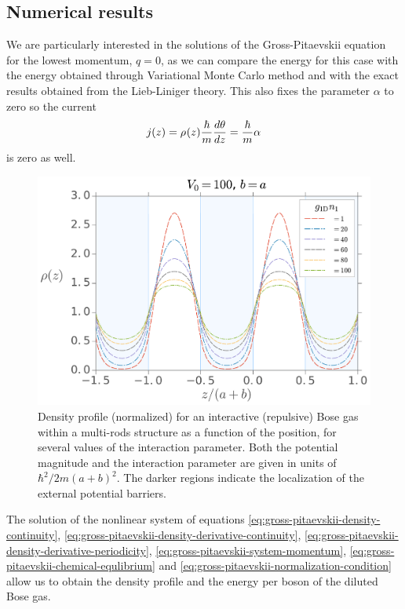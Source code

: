 \subsection{Numerical results}

We are particularly interested in the solutions of the Gross-Pitaevskii equation
for the lowest momentum, $q = 0$, as we can compare the energy for this case
with the energy obtained through Variational Monte Carlo method and with the
exact results obtained from the Lieb-Liniger theory. This also fixes the
parameter $\alpha$ to zero so the current
%
\begin{equation}
  j(z) = {\rho_{}}(z) \frac{\hbar}{m} \frac{d\theta}{dz} = \frac{\hbar}{m} \alpha
\end{equation}
%
is zero as well.
%
\begin{figure}[t!]
  \centering
  \includegraphics[width=0.75\linewidth]{./figures/density_profile_gp_u0-100_r-1}
  \caption{Density profile (normalized) for an interactive (repulsive) Bose gas
    within a multi-rods structure as a function of the position, for several
    values of the interaction parameter. Both the potential magnitude and the
    interaction parameter are given in units of $\hbar^2 / 2 m (a+b)^2$. The
    darker regions indicate the localization of the external potential
    barriers.}
  \label{fig:density-profile-gp-u0-100-r-1}
\end{figure}
%
The solution of the nonlinear system of equations
\eqref{eq:gross-pitaevskii-density-continuity},
\eqref{eq:gross-pitaevskii-density-derivative-continuity},
\eqref{eq:gross-pitaevskii-density-derivative-periodicity},
\eqref{eq:gross-pitaevskii-system-momentum},
\eqref{eq:gross-pitaevskii-chemical-equlibrium} and
\eqref{eq:gross-pitaevskii-normalization-condition} allow us to obtain the
density profile and the energy per boson of the diluted Bose gas.

